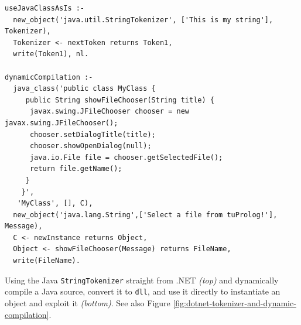 \begin{table}
{\footnotesize
\begin{verbatim}
useJavaClassAsIs :-
  new_object('java.util.StringTokenizer', ['This is my string'], Tokenizer),
  Tokenizer <- nextToken returns Token1,
  write(Token1), nl.

dynamicCompilation :-	
  java_class('public class MyClass {
     public String showFileChooser(String title) {
      javax.swing.JFileChooser chooser = new javax.swing.JFileChooser();
      chooser.setDialogTitle(title);
      chooser.showOpenDialog(null);
      java.io.File file = chooser.getSelectedFile();
      return file.getName();
     }
    }',
   'MyClass', [], C),
  new_object('java.lang.String',['Select a file from tuProlog!'], Message),
  C <- newInstance returns Object,
  Object <- showFileChooser(Message) returns FileName,
  write(FileName).
\end{verbatim}
}
  \caption{Using the Java \texttt{StringTokenizer} straight from \tuprolog{}.NET \textit{(top)} and dynamically compile a Java source, convert it to \texttt{dll}, and use it directly to instantiate an object and exploit it \textit{(bottom)}. See also Figure \ref{fig:dotnet-tokenizer-and-dynamic-compilation}.}
  \label{tab:dotnet-oolibrary-examples2}
\end{table}

